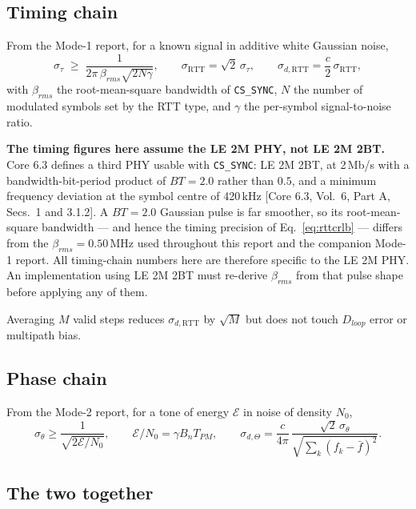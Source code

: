 \documentclass[11pt,a4paper]{article}
\newcommand{\RTT}{\mathrm{RTT}}
\newcommand{\Tpm}{T_{PM}}
\newcommand{\code}[1]{\texttt{\small #1}}
\newcommand{\core}[1]{\textcolor{rulegrey}{\small[Core 6.3, #1]}}
\begin{document}
\subsection{Timing chain}

From the Mode-1 report, for a known signal in additive white Gaussian noise,
\begin{equation}
\sigma_\tau \;\ge\; \frac{1}{2\pi\,\beta_{rms}\sqrt{2N\gamma}},
\qquad
\sigma_{\RTT} = \sqrt2\,\sigma_\tau,
\qquad
\sigma_{d,\RTT} = \frac{c}{2}\,\sigma_{\RTT},
\label{eq:rttcrlb}
\end{equation}
with $\beta_{rms}$ the root-mean-square bandwidth of \code{CS\_SYNC}, $N$ the number of modulated
symbols set by the RTT type, and $\gamma$ the per-symbol signal-to-noise ratio.

\begin{caution}
\textbf{The timing figures here assume the LE 2M PHY, not LE 2M 2BT.} Core 6.3 defines a third PHY
usable with \code{CS\_SYNC}: LE 2M 2BT, at 2\,Mb/s with a bandwidth-bit-period product of $BT=2.0$
rather than $0.5$, and a minimum frequency deviation at the symbol centre of 420\,kHz
\core{Vol.\ 6, Part A, Secs.\ 1 and 3.1.2}. A $BT=2.0$ Gaussian pulse is far smoother, so its
root-mean-square bandwidth --- and hence the timing precision of Eq.~\eqref{eq:rttcrlb} --- differs
from the $\beta_{rms}=0.50$\,MHz used throughout this report and the companion Mode-1 report. All
timing-chain numbers here are therefore specific to the LE 2M PHY. An implementation using LE 2M 2BT
must re-derive $\beta_{rms}$ from that pulse shape before applying any of them.
\end{caution} Averaging $M$ valid
steps reduces $\sigma_{d,\RTT}$ by $\sqrt M$ but does not touch $D_{loop}$ error or multipath bias.

\subsection{Phase chain}

From the Mode-2 report, for a tone of energy $\mathcal{E}$ in noise of density $N_0$,
\begin{equation}
\sigma_\theta \ge \frac{1}{\sqrt{2\mathcal{E}/N_0}},
\qquad \mathcal{E}/N_0 = \gamma B_n \Tpm,
\qquad
\sigma_{d,\Theta} = \frac{c}{4\pi}\,\frac{\sqrt2\,\sigma_\theta}{\sqrt{\sum_k (f_k-\bar f)^2}} .
\label{eq:pbrcrlb}
\end{equation}

\subsection{The two together}
\end{document}

